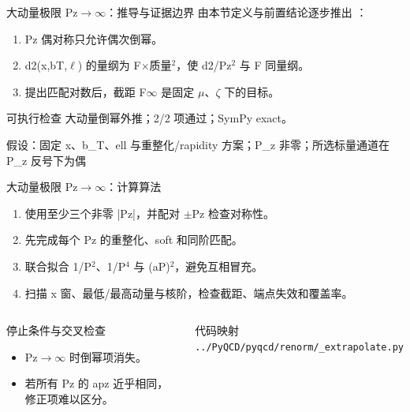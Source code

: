 \begin{frame}[t]{大动量极限 Pz\ensuremath{\rightarrow}\ensuremath{\infty}：推导与证据边界}
\footnotesize
{}\quad 由本节定义与前置结论逐步推出 ：
\begin{enumerate}
\item Pz 偶对称只允许偶次倒幂。
\item d2(x,bT,\ensuremath{\ell}) 的量纲为 F\ensuremath{\times}质量\ensuremath{^{2}}，使 d2/\allowbreak{}Pz\ensuremath{^{2}} 与 F 同量纲。
\item 提出匹配对数后，截距 F\ensuremath{\infty} 是固定 \ensuremath{\mu}、\ensuremath{\zeta} 下的目标。
\end{enumerate}\begin{block}{可执行检查}
\quad 大动量倒幂外推；2/2 项通过；SymPy exact。
\par\scriptsize 假设：固定 x、b\_T、ell 与重整化/\allowbreak{}rapidity 方案；P\_z 非零；所选标量通道在 P\_z 反号下为偶
\end{block}
\end{frame}

\begin{frame}[t]{大动量极限 Pz\ensuremath{\rightarrow}\ensuremath{\infty}：计算算法}
\footnotesize
{}\begin{enumerate}
\item 使用至少三个非零 |Pz|，并配对 \ensuremath{\pm}Pz 检查对称性。
\item 先完成每个 Pz 的重整化、soft 和同阶匹配。
\item 联合拟合 1/\allowbreak{}P\ensuremath{^{2}}、1/\allowbreak{}P\ensuremath{^{4}} 与 (aP)\ensuremath{^{2}}，避免互相冒充。
\item 扫描 x 窗、最低/\allowbreak{}最高动量与核阶，检查截距、端点失效和覆盖率。
\end{enumerate}\begin{columns}[T,onlytextwidth]
\begin{block}{停止条件与交叉检查}\scriptsize\begin{itemize}
\item[\CheckMark] Pz\ensuremath{\rightarrow}\ensuremath{\infty} 时倒幂项消失。
\item[\CheckMark] 若所有 Pz 的 apz 近乎相同，修正项难以区分。
\end{itemize}\end{block}
\begin{block}{代码映射}
\scriptsize \texttt{.\allowbreak{}.\allowbreak{}/\allowbreak{}PyQCD/\allowbreak{}pyqcd/\allowbreak{}renorm/\allowbreak{}\_\allowbreak{}extrapolate.\allowbreak{}py}
\end{block}\end{columns}\end{frame}

